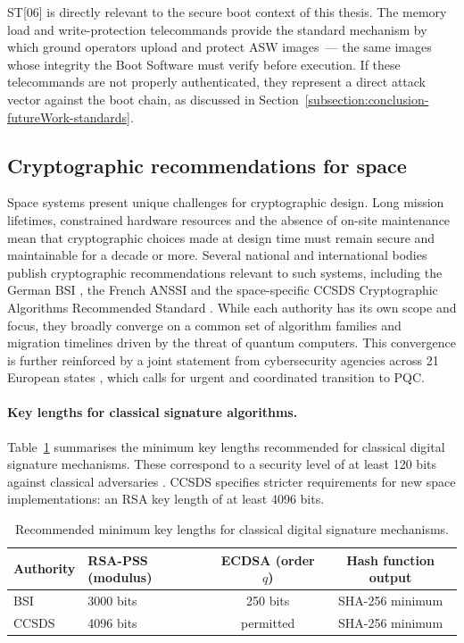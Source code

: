ST[06] is directly relevant to the secure boot context of this thesis. The memory load and write-protection telecommands provide the standard mechanism by which ground operators upload and protect ASW images~--- the same images whose integrity the Boot Software must verify before execution. If these telecommands are not properly authenticated, they represent a direct attack vector against the boot chain, as discussed in Section~\ref{subsection:conclusion-futureWork-standards}.

\subsection{Cryptographic recommendations for space}
\label{subsection:bg-space-cryptoReccs}

Space systems present unique challenges for cryptographic design. Long mission lifetimes, constrained hardware resources and the absence of on-site maintenance mean that cryptographic choices made at design time must remain secure and maintainable for a decade or more. Several national and international bodies publish cryptographic recommendations relevant to such systems, including the German BSI \cite{bsi_crypto_key_length}, the French ANSSI \cite{anssi_post_quantum_crypto} and the space-specific CCSDS Cryptographic Algorithms Recommended Standard \cite{ccsds_crypto_algorithms}. While each authority has its own scope and focus, they broadly converge on a common set of algorithm families and migration timelines driven by the threat of quantum computers. This convergence is further reinforced by a joint statement from cybersecurity agencies across 21 European states \cite{EU_post_quantum_transition}, which calls for urgent and coordinated transition to PQC.

\paragraph{Key lengths for classical signature algorithms.}
Table~\ref{tab:classical-key-lengths} summarises the minimum key lengths recommended for classical digital signature mechanisms. These correspond to a security level of at least 120 bits against classical adversaries \cite{bsi_crypto_key_length}. CCSDS \cite{ccsds_crypto_algorithms} specifies stricter requirements for new space implementations: an RSA key length of at least 4096 bits.

\begin{table}[h]
    \centering
    \caption{Recommended minimum key lengths for classical digital signature mechanisms.}
    \label{tab:classical-key-lengths}
    \begin{tabular}{llcc}
        \hline
        \textbf{Authority} & \textbf{RSA-PSS (modulus)} & \textbf{ECDSA (order $q$)} & \textbf{Hash function output} \\
        \hline
        BSI \cite{bsi_crypto_key_length}             & 3000 bits & 250 bits & SHA-256 minimum \\
        CCSDS \cite{ccsds_crypto_algorithms}          & 4096 bits & permitted & SHA-256 minimum \\
        \hline
    \end{tabular}
\end{table}

